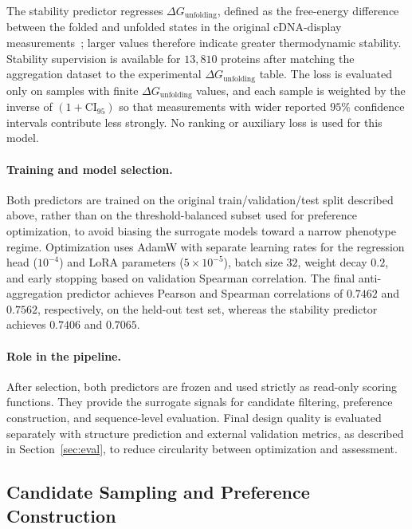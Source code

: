\documentclass[pdflatex,sn-mathphys-num]{sn-jnl}%
\theoremstyle{thmstyleone}%
\theoremstyle{thmstyletwo}%
\theoremstyle{thmstylethree}%
\begin{document}
The stability predictor regresses $\Delta G_{\mathrm{unfolding}}$, defined as the free-energy difference between the folded and unfolded states in the original cDNA-display measurements~\cite{example2026}; larger values therefore indicate greater thermodynamic stability. Stability supervision is available for $13{,}810$ proteins after matching the aggregation dataset to the experimental $\Delta G_{\mathrm{unfolding}}$ table. The loss is evaluated only on samples with finite $\Delta G_{\mathrm{unfolding}}$ values, and each sample is weighted by the inverse of $(1+\mathrm{CI}_{95})$ so that measurements with wider reported $95\%$ confidence intervals contribute less strongly. No ranking or auxiliary loss is used for this model.

\paragraph{Training and model selection.}
Both predictors are trained on the original train/validation/test split described above, rather than on the threshold-balanced subset used for preference optimization, to avoid biasing the surrogate models toward a narrow phenotype regime. Optimization uses AdamW with separate learning rates for the regression head ($10^{-4}$) and LoRA parameters ($5\times 10^{-5}$), batch size $32$, weight decay $0.2$, and early stopping based on validation Spearman correlation. The final anti-aggregation predictor achieves Pearson and Spearman correlations of $0.7462$ and $0.7562$, respectively, on the held-out test set, whereas the stability predictor achieves $0.7406$ and $0.7065$.

\paragraph{Role in the pipeline.}
After selection, both predictors are frozen and used strictly as read-only scoring functions. They provide the surrogate signals for candidate filtering, preference construction, and sequence-level evaluation. Final design quality is evaluated separately with structure prediction and external validation metrics, as described in Section~\ref{sec:eval}, to reduce circularity between optimization and assessment.


\subsection{Candidate Sampling and Preference Construction}\label{sec:sampling}
\end{document}
